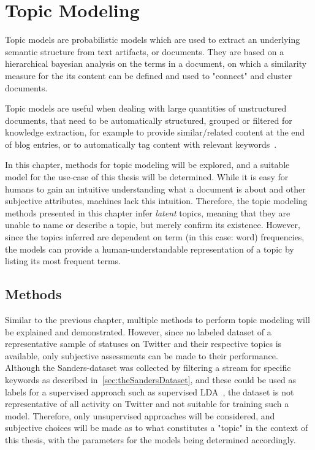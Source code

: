 \chapter{Topic Modeling}
\label{ch:topicModeling}

Topic models are probabilistic models which are used to extract an underlying semantic structure from text artifacts, or documents.
They are based on a hierarchical bayesian analysis on the terms in a document,
on which a similarity measure for the its content can be defined and used to "connect" and cluster documents.

Topic models are useful when dealing with large quantities of unstructured documents,
that need to be automatically structured, grouped or filtered for knowledge extraction,
for example to provide similar/related content at the end of blog entries,
or to automatically tag content with relevant keywords~\cite{blei2009topic}.

In this chapter, methods for topic modeling will be explored,
and a suitable model for the use-case of this thesis will be determined.
While it is easy for humans to gain an intuitive understanding what a document is about
and other subjective attributes, machines lack this intuition.
Therefore, the topic modeling methods presented in this chapter infer \textit{latent} topics,
meaning that they are unable to name or describe a topic, but merely confirm its existence.
However, since the topics inferred are dependent on term (in this case: word) frequencies,
the models can provide a human-understandable representation of a topic by listing its most frequent terms.

\section{Methods}
\label{sec:methods_topicmodeling}

Similar to the previous chapter, multiple methods to perform topic modeling will be explained and demonstrated.
However, since no labeled dataset of a representative sample of statuses on Twitter and their respective topics is available,
only subjective assessments can be made to their performance.
Although the Sanders-dataset was collected by filtering a stream for specific keywords as described in~\cref{sec:theSandersDataset},
and these could be used as labels for a supervised approach such as supervised LDA~\cite{Blei2008},
the dataset is not representative of all activity on Twitter and not suitable for training such a model.
Therefore, only unsupervised approaches will be considered,
and subjective choices will be made as to what constitutes a "topic" in the context of this thesis,
with the parameters for the models being determined accordingly.

